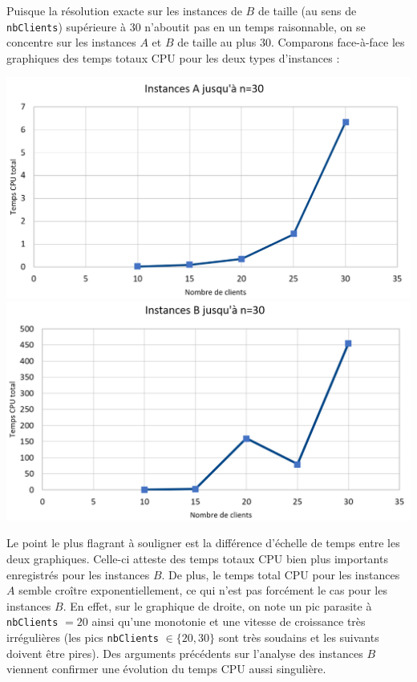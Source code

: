 \documentclass[french, 11pt, a4paper]{article} %
\newcommand{\smb}{\smallbreak}
\begin{document}
Puisque la résolution exacte sur les instances de $B$ de taille (au sens de \verb+nbClients+) supérieure à 30 n'aboutit pas en un temps raisonnable,
on se concentre sur les instances $A$ et $B$ de taille au plus 30.
Comparons face-à-face les graphiques des temps totaux CPU pour les deux types d'instances :
\begin{center}
    \includegraphics[scale=0.34]{GraphInstA30.PNG}
    \includegraphics[scale=0.34]{GraphInstB30.PNG}
\end{center}

Le point le plus flagrant à souligner est la différence d'échelle de temps entre les deux graphiques. Celle-ci 
atteste des temps totaux CPU bien plus importants enregistrés pour les instances $B$.
\smb De plus, le temps total CPU pour les instances $A$ semble croître exponentiellement, ce qui n'est pas forcément
le cas pour les instances $B$. En effet, sur le graphique de droite, on note un pic parasite à \verb+nbClients+ $=20$
ainsi qu'une monotonie et une vitesse de croissance très irrégulières (les pics \verb+nbClients+ $\in \{20,30\}$ sont très soudains et les suivants doivent être pires).
Des arguments précédents sur l'analyse des instances $B$ viennent confirmer une évolution du temps CPU aussi singulière.
\end{document}
